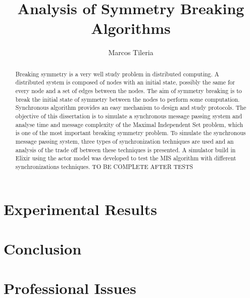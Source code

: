 \documentclass[11pt]{article} %
\title{Analysis of Symmetry Breaking Algorithms}
\author{Marcos Tileria}
\theoremstyle{plain}
\theoremstyle{definition}
\begin{document}
\maketitle

\declaration

\begin{abstract}
  
Breaking symmetry is a very well study problem in distributed computing. A distributed system is composed of nodes with an initial state, possibly the same for every node and a set of edges between the nodes. The aim of symmetry breaking is to break the initial state of symmetry between the nodes to perform some computation. Synchronous algorithm provides an easy mechanism to design and study protocols. The objective of this dissertation is to simulate a synchronous message passing system and analyse time and message complexity of the Maximal Independent Set problem, which is one of the most important breaking symmetry problem. To simulate the synchronous message passing system, three types of synchronization techniques are used and an analysis of the trade off between these techniques is presented. A simulator build in Elixir using the actor model was developed to test the MIS algorithm with different synchronizations techniques. TO BE COMPLETE AFTER TESTS 
  
\end{abstract}














\section{Experimental Results}

\section{Conclusion}

\section{Professional Issues}




\end{document}
